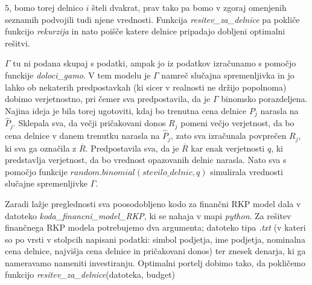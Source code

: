\documentclass[a4paper,12pt]{article}
\theoremstyle{definition}
\begin{document}
$5$, bomo torej delnico $i$ šteli dvakrat, prav tako pa bomo v zgoraj omenjenih seznamih
podvojili tudi njene vrednosti. Funkcija \textit{resitev\_za\_delnice} pa pokliče funkcijo \textit{rekurzija}
in nato poišče katere delnice pripadajo dobljeni optimalni rešitvi.
\par
$\Gamma$ tu ni podana skupaj s podatki, ampak jo iz podatkov izračunamo s pomočjo funckije \textit{doloci\_gamo}.
V tem modelu je $\Gamma$ namreč slučajna spremenljivka in jo lahko ob nekaterih predpostavkah (ki 
sicer v realnosti ne držijo popolnoma) dobimo verjetnostno, pri čemer sva predpostavila, da je $\Gamma$
binomsko porazdeljena. Najina ideja je bila torej ugotoviti, kdaj bo trenutna cena delnice $P_j$ narasla na 
$\hat{P}_j$. Sklepala sva, da večji pričakovani donos $R_j$ pomeni večjo verjetnost, da
bo cena delnice v danem trenutku narasla na $\hat{P}_j$, zato sva izračunala povprečen $R_j$, ki
sva ga označila z $\overline{R}$. 
Predpostavila sva, da je $\overline{R}$ kar enak verjetnosti $q$, ki predstavlja verjetnost,
da bo vrednost opazovanih delnic narasla. Nato sva s pomočjo funkcije $random.binomial(stevilo\_delnic, q)$ 
simulirala vrednosti slučajne spremenljivke $\Gamma$.
\par
Zaradi lažje preglednosti sva poosodobljeno kodo za finančni RKP model dala v datoteko
\textit{koda\_financni\_model\_RKP}, ki se nahaja v mapi \textit{python}. 
Za rešitev finančnega RKP modela potrebujemo dva argumenta; datoteko tipa \textit{.txt} (v kateri
so po vrsti v stolpcih napisani podatki: simbol podjetja, ime podjetja, nominalna cena delnice, 
najvišja cena delnice in pričakovani donos) ter znesek denarja, ki ga nameravamo nameniti investiranju.
Optimalni portelj dobimo tako, da pokličemo funkcijo \textit{resitev\_za\_delnice}(datoteka, budget)
\end{document}
